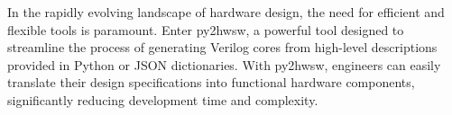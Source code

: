 %

In the rapidly evolving landscape of hardware design, the need for efficient and flexible tools is paramount. Enter py2hwsw, a powerful tool designed to streamline the process of generating Verilog cores from high-level descriptions provided in Python or JSON dictionaries. With py2hwsw, engineers can easily translate their design specifications into functional hardware components, significantly reducing development time and complexity.
